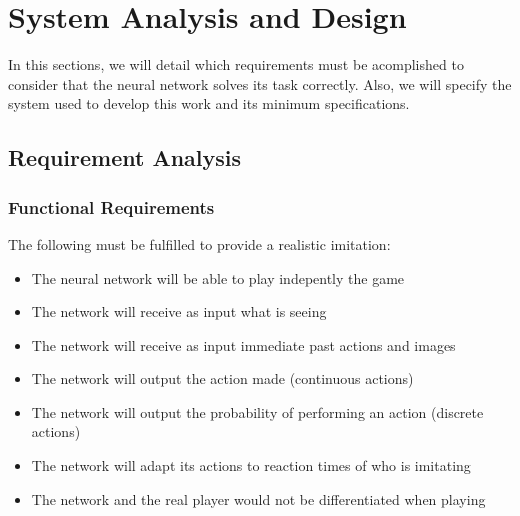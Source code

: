 %
%
%

\chapter{System Analysis and Design}

\minitoc{}

\bigskip{}

In this sections, we will detail which requirements must be acomplished to consider that the neural network solves its task correctly. Also, we will specify the system used to develop this work and its minimum specifications.

\section{Requirement Analysis}

\subsection{Functional Requirements}

The following must be fulfilled to provide a realistic imitation:

\begin{itemize}
 \item The neural network will be able to play indepently the game
 \item The network will receive as input what is seeing
 \item The network will receive as input immediate past actions and images
 \item The network will output the action made (continuous actions)
 \item The network will output the probability of performing an action (discrete actions)
 \item The network will adapt its actions to reaction times of who is imitating
 \item The network and the real player would not be differentiated when playing
\end{itemize}

